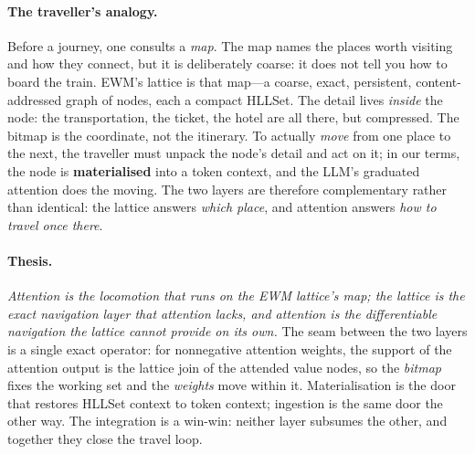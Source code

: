 \documentclass[11pt,a4paper]{article}
\theoremstyle{remark}
\begin{document}
\paragraph{The traveller's analogy.}
Before a journey, one consults a \emph{map}. The map names the places worth
visiting and how they connect, but it is deliberately coarse: it does not tell
you how to board the train. EWM's lattice is that map---a coarse, exact,
persistent, content-addressed graph of nodes, each a compact HLLSet. The detail
lives \emph{inside} the node: the transportation, the ticket, the hotel are all
there, but compressed. The bitmap is the coordinate, not the itinerary. To
actually \emph{move} from one place to the next, the traveller must unpack the
node's detail and act on it; in our terms, the node is \textbf{materialised}
into a token context, and the LLM's graduated attention does the moving. The two
layers are therefore complementary rather than identical: the lattice answers
\emph{which place}, and attention answers \emph{how to travel once there}.

\paragraph{Thesis.}
\emph{Attention is the locomotion that runs on the EWM lattice's map; the
lattice is the exact navigation layer that attention lacks, and attention is the
differentiable navigation the lattice cannot provide on its own.} The seam
between the two layers is a single exact operator: for nonnegative attention
weights, the support of the attention output is the lattice join of the attended
value nodes, so the \emph{bitmap} fixes the working set and the \emph{weights}
move within it. Materialisation is the door that restores HLLSet context to
token context; ingestion is the same door the other way. The integration is a
win-win: neither layer subsumes the other, and together they close the travel
loop.
\end{document}
